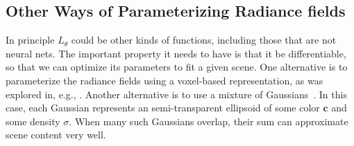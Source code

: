 

\subsection{Other Ways of Parameterizing Radiance fields}

In principle $L_{\theta}$ could be other kinds of functions, including those that are not neural nets. The important property it needs to have is that it be differentiable, so that we can optimize its parameters to fit a given scene. One alternative is to parameterize the radiance fields using a voxel-based representation, as was explored in, e.g., \cite{fridovich2022plenoxels}. Another alternative is to use a mixture of Gaussians~\cite{kerbl20233d}. In this case, each Gaussian represents an semi-transparent ellipsoid of some color $\mathbf{c}$ and some density $\sigma$. When many such Gaussians overlap, their sum can approximate scene content very well.





